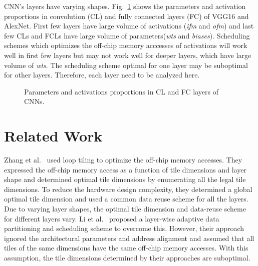 CNN's layers have varying shapes. Fig.~\ref{fig:ParamsNactProp} shows the parameters and activation proportions in convolution (CL) and fully connected layers (FC) of VGG16 and AlexNet. First few layers have large volume of activations (\textit{ifm} and \textit{ofm}) and last few CLs and FCLs have large volume of parameters(\textit{wts} and \textit{biases}). Scheduling schemes which optimizes the off-chip memory acccesses of activations will work well in first few layers but may not work well for deeper layers, which have large volume of \textit{wts}. The scheduling scheme optimal for one layer may be suboptimal for other layers. Therefore, each layer need to be analyzed here.
\begin{figure}[!htb]
	\centering
	\captionsetup{font=sf}	
	\hfil	
	\hfil	
	\caption{Parameters and activations proportions in CL and FC layers of CNNs.}
	\label{fig:ParamsNactProp}
\end{figure}
\section{Related Work}
Zhang et al.~\cite{zhang2015optimizing} used loop tiling to optimize the off-chip memory accesses. They expressed the off-chip memory access as a function of tile dimensions and layer shape and determined optimal tile dimensions by enumerating all the legal tile dimensions. To reduce the hardware design complexity, they determined a global optimal tile dimension and used a common data reuse scheme for all the layers. Due to varying layer shapes, the optimal tile dimension and data-reuse scheme for different layers vary. Li et al.~\cite{Li2018SmartShuttleOO} proposed a layer-wise adaptive data partitioning and scheduling scheme to overcome this. However, their approach ignored the architectural parameters and address alignment and assumed that all tiles of the same dimensions have the same off-chip memory accesses. With this assumption, the tile dimensions determined by their approaches are suboptimal.
